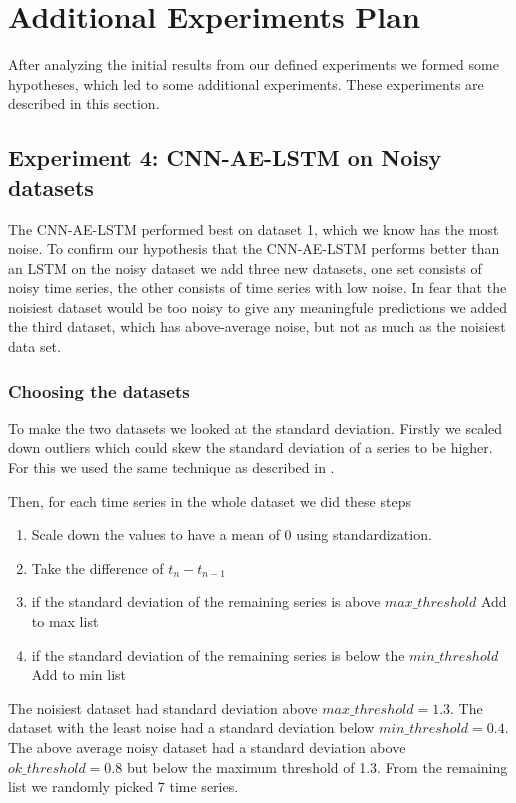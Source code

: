 \section{Additional Experiments Plan}
\label{section:Results:AdditionalExperimentalPlan}
After analyzing the initial results from our defined experiments
we formed some hypotheses, which led to some additional experiments.
These experiments are described in this section.

\subsection{Experiment 4: CNN-AE-LSTM on Noisy datasets}
The CNN-AE-LSTM performed best on dataset 1, which we know
has the most noise. To confirm our hypothesis
that the CNN-AE-LSTM performs better than an LSTM
on the noisy dataset we add three new datasets,
one set consists of noisy time series,
the other consists of time series with low noise.
In fear that the noisiest dataset would be too noisy to give any meaningfule
predictions we added the third dataset, which has above-average noise, but not
as much as the noisiest data set.


\subsubsection{Choosing the datasets}
To make the two datasets we looked at the standard deviation.
Firstly we scaled down outliers which could skew the standard deviation of
a series to be higher. For this we used the same technique
as described in .

Then, for each time series in the whole dataset we did these steps
\begin{enumerate}
  \item Scale down the values to have a mean of 0 using standardization.
  \item Take the difference of $t_n - t_{n-1}$
  \item if the standard deviation of the remaining series is above $max\_threshold$ \-\> Add to max list
  \item if the standard deviation of the remaining series is below the $min\_threshold$ \-\> Add to min list
\end{enumerate}

The noisiest dataset had standard deviation above $max\_threshold = 1.3$.
The dataset with the least noise had a standard deviation below $min\_threshold = 0.4$.
The above average noisy dataset had a standard deviation above $ok\_threshold = 0.8$
but below the maximum threshold of 1.3.
From the remaining list we randomly picked 7 time series.


